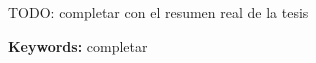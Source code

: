 % 
TODO: completar con el resumen real de la tesis


\bigskip
\noindent\textbf{Keywords:} completar %
